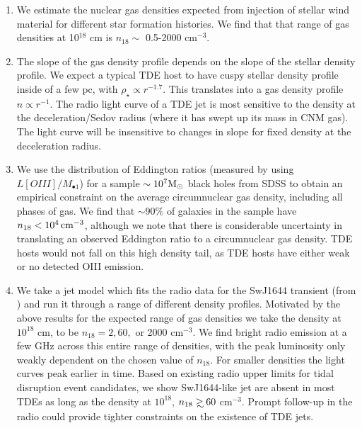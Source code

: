 \documentclass[usenatbib,fleqn]{mnras}
\newcommand\gsim{\mathrel{\rlap{\lower4pt\hbox{\hskip1pt$\sim$}}
    \raise1pt\hbox{$>$}}}
\newcommand{\Mbh}[1][]{M_{\bullet1}}
\newcommand{\Msun}{{\rm M_\odot}}
\begin{document}
\begin{enumerate}
\item We estimate the nuclear gas densities expected from injection of
  stellar wind material for different star formation histories. We
  find that that range of gas densities at 10$^{18}$ cm is $n_{18}
  \sim$ 0.5-2000 cm$^{-3}$.

\item The slope of the gas density profile depends on the slope of the
  stellar density profile. We expect a typical TDE host to have cuspy
  stellar density profile inside of a few pc, with $\rho_\star
  \propto r^{-1.7}$. This translates into a gas density profile $n
  \propto r^{-1}$. The radio light curve of a TDE jet is most
  sensitive to the density at the deceleration/Sedov radius (where it
  has swept up its mass in CNM gas). The light curve will be
  insensitive to changes in slope for fixed density at the
  deceleration radius.

\item We use the distribution of Eddington ratios (measured by
  \citealt{Kauffmann&Heckman2009} using $L[OIII]/\Mbh$) for a sample
  $\sim 10^{7} \Msun$ black holes from SDSS to obtain an empirical
  constraint on the average circumnuclear gas density, including all
  phases of gas. We find that $\sim90\%$ of galaxies in the sample
  have $n_{18}<10^{4} \, {\rm cm}^{-3}$, although we note that there is
  considerable uncertainty in translating an observed Eddington ratio
  to a circumnuclear gas density. TDE hosts would not fall on this
  high density tail, as TDE hosts have either weak or no detected OIII
  emission.

\item We take a jet model which fits the radio data for the SwJ1644
  transient (from \citealt{Mimica+2015}) and run it through a range of
  different density profiles. Motivated by the above results for the
  expected range of gas densities we take the density at $10^{18}$ cm,
  to be $n_{18}=2, 60,$ or 2000 cm$^{-3}$. We find bright radio
  emission at a few GHz across this entire range of densities, with
  the peak luminosity only weakly dependent on the chosen value of
  $n_{18}$.  For smaller densities the light curves peak earlier in
  time. Based on existing radio upper limits for tidal disruption
  event candidates, we show SwJ1644-like jet are absent in most TDEs
  as long as the density at $10^{18}$, $n_{18} \gsim  60$
  cm$^{-3}$. Prompt follow-up in the radio could provide tighter
  constraints on the existence of TDE jets.  
\end{enumerate}
\end{document}
